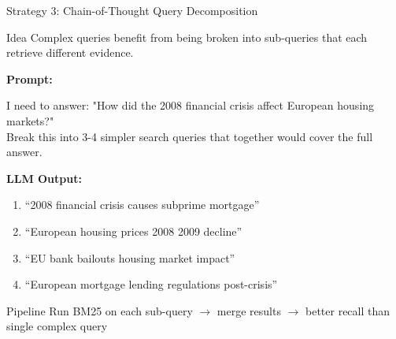 \documentclass[aspectratio=169]{beamer}
\begin{document}
\begin{frame}[shrink=5]{Strategy 3: Chain-of-Thought Query Decomposition}
\begin{block}{Idea}
Complex queries benefit from being broken into sub-queries that each retrieve different evidence.
\end{block}

\vspace{0.5em}

\textbf{Prompt:}
\begin{tcolorbox}[colback=gray!10, colframe=gray!50, fontupper=\small\ttfamily]
I need to answer: "How did the 2008 financial crisis affect European housing markets?"\\
Break this into 3-4 simpler search queries that together would cover the full answer.
\end{tcolorbox}

\vspace{0.5em}

\textbf{LLM Output:}
\begin{enumerate}
    \item ``2008 financial crisis causes subprime mortgage''
    \item ``European housing prices 2008 2009 decline''
    \item ``EU bank bailouts housing market impact''
    \item ``European mortgage lending regulations post-crisis''
\end{enumerate}

\vspace{0.5em}

\begin{block}{Pipeline}
Run BM25 on each sub-query $\to$ merge results $\to$ better recall than single complex query
\end{block}
\end{frame}
\end{document}
